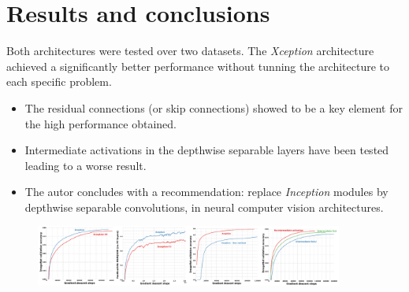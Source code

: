 \documentclass[10pt,a4paper]{article}
\begin{document}
\section*{Results and conclusions}
Both architectures were tested over two datasets. The \textit{Xception} architecture achieved a significantly better performance without tunning the architecture to each specific problem.

\begin{itemize}
\item The residual connections (or skip connections) showed to be a key element for the high performance obtained.
\item Intermediate activations in the depthwise separable layers have been tested leading to a worse result.
\item The autor concludes with a recommendation: replace \textit{Inception} modules by depthwise separable convolutions, in neural computer vision architectures.
\end{itemize}

\begin{figure}[h!]
	\centering
	\includegraphics[width=0.9\textwidth]{img/results.png}
\end{figure}
\end{document}
